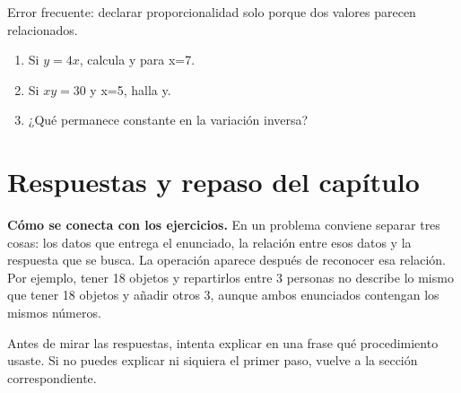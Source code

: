\documentclass[10pt,oneside,openany]{book}
\begin{document}
\begin{ojo}
Error frecuente: declarar proporcionalidad solo porque dos valores parecen relacionados.
\end{ojo}

\begin{practica}

\begin{enumerate}

\item Si $y=4x$, calcula y para x=7.

\item Si $xy=30$ y x=5, halla y.

\item ¿Qué permanece constante en la variación inversa?

\end{enumerate}

\end{practica}



\section{Respuestas y repaso del capítulo}

\textbf{Cómo se conecta con los ejercicios.} En un problema conviene separar tres cosas: los datos que entrega el enunciado, la relación entre esos datos y la respuesta que se busca. La operación aparece después de reconocer esa relación. Por ejemplo, tener 18 objetos y repartirlos entre 3 personas no describe lo mismo que tener 18 objetos y añadir otros 3, aunque ambos enunciados contengan los mismos números.

Antes de mirar las respuestas, intenta explicar en una frase qué procedimiento usaste. Si no puedes explicar ni siquiera el primer paso, vuelve a la sección correspondiente.
\end{document}
